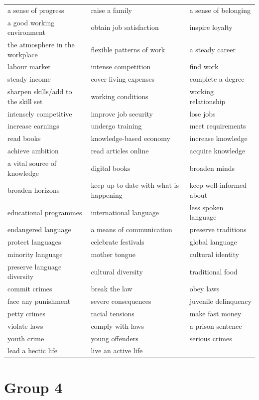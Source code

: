\documentclass[10pt,a4paper]{article}
\begin{document}
{\begin{longtable}{@{}*{3}{p{}}@{}}
a sense of progress & raise a family & a sense of belonging \\
a good working environment & obtain job satisfaction & inspire loyalty \\
the atmosphere in the workplace & flexible patterns of work & a steady career \\
labour market & intense competition & find work \\
steady income & cover living expenses & complete a degree \\
sharpen skills/add to the skill set & working conditions & working relationship \\
intensely competitive & improve job security & lose jobs \\
increase earnings & undergo training & meet requirements \\
read books & knowledge-based economy & increase knowledge \\
achieve ambition & read articles online & acquire knowledge \\
a vital source of knowledge & digital books & broaden minds \\
broaden horizons & keep up to date with what is happening & keep well-informed about \\
educational programmes & international language & less spoken language \\
endangered language & a means of communication & preserve traditions \\
protect languages & celebrate festivals & global language \\
minority language & mother tongue & cultural identity \\
preserve language diversity & cultural diversity & traditional food \\
commit crimes & break the law & obey laws \\
face any punishment & severe consequences & juvenile delinquency \\
petty crimes & racial tensions & make fast money \\
violate laws & comply with laws & a prison sentence \\
youth crime & young offenders & serious crimes \\
lead a hectic life & live an active life &  \\
\end{longtable}}

\section*{Group 4}
\end{document}
